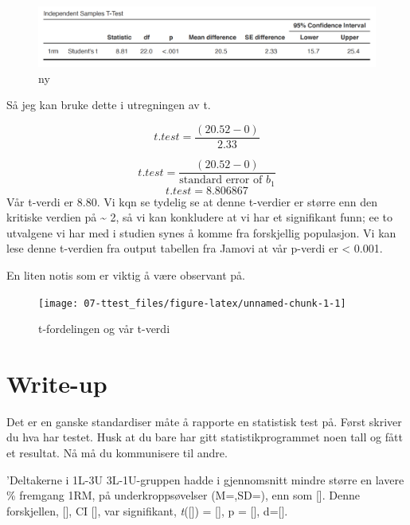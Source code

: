 \documentclass[
]{book}
\begin{document}
\begin{figure}
\centering
\includegraphics{output.png}
\caption{ny}
\end{figure}

Så jeg kan bruke dette i utregningen av t.

\[
t.test = \frac{(20.52 - 0)}{2.33}
\]

\[
t.test = \frac{(20.52 - 0)}{\text{standard error of } b_1}
\]
\[
t.test = 8.806867
\]
Vår t-verdi er 8.80. Vi kqn se tydelig se at denne t-verdier er større enn den kritiske verdien på \textasciitilde{} 2, så vi kan konkludere at vi har et signifikant funn; ee to utvalgene vi har med i studien synes å komme fra forskjellig populasjon. Vi kan lese denne t-verdien fra output tabellen fra Jamovi at vår p-verdi er \textless{} 0.001.

En liten notis som er viktig å være observant på.

\begin{figure}

{\centering \texttt{[image: 07-ttest\_files/figure-latex/unnamed-chunk-1-1]} 

}

\caption{t-fordelingen og vår t-verdi}\label{fig:unnamed-chunk-1}
\end{figure}

\hypertarget{write-up}{%
\chapter{Write-up}\label{write-up}}

Det er en ganske standardiser måte å rapporte en statistisk test på. Først skriver du hva har testet. Husk at du bare har gitt statistikprogrammet noen tall og fått et resultat. Nå må du kommunisere til andre.

'Deltakerne i 1L-3U 3L-1U-gruppen hadde i gjennomsnitt mindre større en lavere \% fremgang 1RM, på underkroppsøvelser (M=,SD=), enn som {[}{]}. Denne forskjellen, {[}{]}, CI {[}{]}, var signifikant, \emph{t}({[}{]}) = {[}{]}, p = {[}{]}, d={[}{]}.

  
\end{document}
